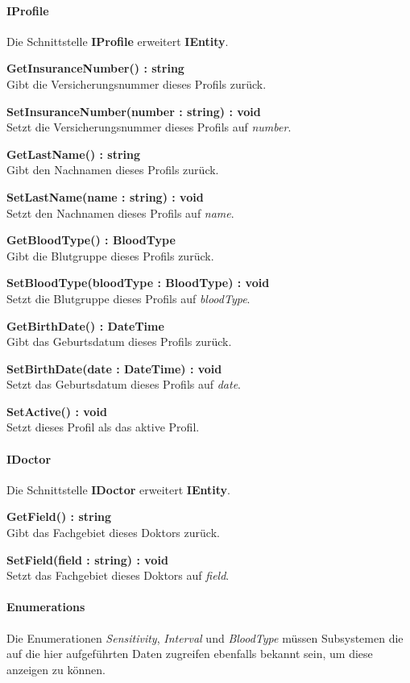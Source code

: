 \documentclass[a4paper]{scrreprt}
\begin{document}
\paragraph{IProfile}
Die Schnittstelle \textbf{IProfile} erweitert \textbf{IEntity}.

\textbf{GetInsuranceNumber() : string}\\
Gibt die Versicherungsnummer dieses Profils zurück.

\textbf{SetInsuranceNumber(number : string) : void}\\
Setzt die Versicherungsnummer dieses Profils auf \textit{number}.

\textbf{GetLastName() : string}\\
Gibt den Nachnamen dieses Profils zurück.

\textbf{SetLastName(name : string) : void}\\
Setzt den Nachnamen dieses Profils auf \textit{name}.

\textbf{GetBloodType() : BloodType}\\
Gibt die Blutgruppe dieses Profils zurück.

\textbf{SetBloodType(bloodType : BloodType) : void}\\
Setzt die Blutgruppe dieses Profils auf \textit{bloodType}.

\textbf{GetBirthDate() : DateTime}\\
Gibt das Geburtsdatum dieses Profils zurück.

\textbf{SetBirthDate(date : DateTime) : void}\\
Setzt das Geburtsdatum dieses Profils auf \textit{date}.

\textbf{SetActive() : void}\\
Setzt dieses Profil als das aktive Profil.

\paragraph{IDoctor}
Die Schnittstelle \textbf{IDoctor} erweitert \textbf{IEntity}.

\textbf{GetField() : string}\\
Gibt das Fachgebiet dieses Doktors zurück.

\textbf{SetField(field : string) : void}\\
Setzt das Fachgebiet dieses Doktors auf \textit{field}.

\paragraph{Enumerations}
Die Enumerationen \textit{Sensitivity}, \textit{Interval} und \textit{BloodType} müssen Subsystemen die auf die hier aufgeführten Daten zugreifen ebenfalls bekannt sein, um diese anzeigen zu können.
\end{document}
